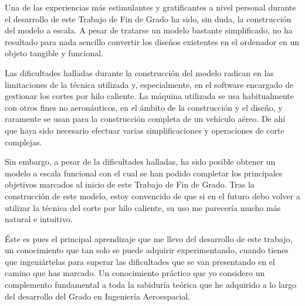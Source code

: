 Una de las experiencias más estimulantes y gratificantes a nivel personal durante el desarrollo de este Trabajo de Fin de Grado ha sido, sin duda, la construcción del modelo a escala. A pesar de tratarse un modelo bastante simplificado, no ha resultado para nada sencillo convertir los diseños existentes en el ordenador en un objeto tangible y funcional.

Las dificultades halladas durante la construcción del modelo radican en las limitaciones de la técnica utilizada y, especialmente, en el software encargado de gestionar los cortes por hilo caliente. La máquina utilizada se usa habitualmente con otros fines no aeronáuticos, en el ámbito de la construcción y el diseño, y raramente se usan para la construcción completa de un vehículo aéreo. De ahí que haya sido necesario efectuar varias simplificaciones y operaciones de corte complejas.

Sin embargo, a pesar de la dificultades halladas, ha sido posible obtener un modelo a escala funcional con el cual se han podido completar los principales objetivos marcados al inicio de este Trabajo de Fin de Grado. Tras la construcción de este modelo, estoy convencido de que si en el futuro debo volver a utilizar la técnica del corte por hilo caliente, su uso me parecería mucho más natural e intuitivo.

Éste es pues el principal aprendizaje que me llevo del desarrollo de este trabajo, un conocimiento que tan solo se puede adquirir experimentando, cuando tienes que ingeniártelas para superar las dificultades que se van presentando en el camino que has marcado. Un conocimiento práctico que yo considero un complemento fundamental a toda la sabiduría teórica que he adquirido a lo largo del desarrollo del Grado en Ingeniería Aeroespacial.

